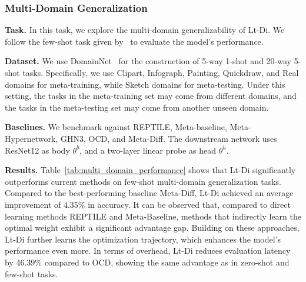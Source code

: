 \subsubsection{Multi-Domain Generalization}\label{sec:multi-domain}
\noindent\textbf{Task.} In this task, we explore the multi-domain generalizability of Lt-Di. We follow the few-shot task given by~\citet{hierar_meta} to evaluate the model's performance.
\par
\noindent\textbf{Dataset.} We use DomainNet~\cite{DomainNet} for the construction of 5-way 1-shot and 20-way 5-shot tasks. Specifically, we use Clipart, Infograph, Painting, Quickdraw, and Real domains for meta-training, while Sketch domains for meta-testing. Under this setting, the tasks in the meta-training set may come from different domains, and the tasks in the meta-testing set may come from another unseen domain.
\par
\noindent\textbf{Baselines.}
We benchmark against REPTILE, Meta-baseline, Meta-Hypernetwork, GHN3, OCD, and Meta-Diff. The downstream network uses ResNet12 as body $\theta^b$, and a two-layer linear probe as head $\theta^h$.
\par
\noindent\textbf{Results.}
Table~\ref{tab:multi_domain_performance} shows that Lt-Di significantly outperforms current methods on few-shot multi-domain generalization tasks. Compared to the best-performing baseline Meta-Diff, Lt-Di achieved an average improvement of 4.35\% in accuracy. It can be observed that, compared to direct learning methods REPTILE and Meta-Baseline, methods that indirectly learn the optimal weight exhibit a significant advantage gap. Building on these approaches, Lt-Di further learns the optimization trajectory, which enhances the model's performance even more. In terms of overhead, Lt-Di reduces evaluation latency by 46.39\% compared to OCD, showing the same advantage as in zero-shot and few-shot tasks.
